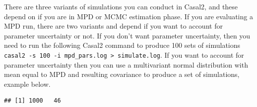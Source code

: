\documentclass[
]{book}
\newenvironment{Shaded}{\begin{snugshade}}{\end{snugshade}}
\newcommand{\AlertTok}[1]{\textcolor[rgb]{0.94,0.16,0.16}{#1}}
\newcommand{\AttributeTok}[1]{\textcolor[rgb]{0.77,0.63,0.00}{#1}}
\newcommand{\CommentTok}[1]{\textcolor[rgb]{0.56,0.35,0.01}{\textit{#1}}}
\newcommand{\ConstantTok}[1]{\textcolor[rgb]{0.00,0.00,0.00}{#1}}
\newcommand{\ControlFlowTok}[1]{\textcolor[rgb]{0.13,0.29,0.53}{\textbf{#1}}}
\newcommand{\DecValTok}[1]{\textcolor[rgb]{0.00,0.00,0.81}{#1}}
\newcommand{\DocumentationTok}[1]{\textcolor[rgb]{0.56,0.35,0.01}{\textbf{\textit{#1}}}}
\newcommand{\FunctionTok}[1]{\textcolor[rgb]{0.00,0.00,0.00}{#1}}
\newcommand{\NormalTok}[1]{#1}
\newcommand{\OtherTok}[1]{\textcolor[rgb]{0.56,0.35,0.01}{#1}}
\newcommand{\SpecialCharTok}[1]{\textcolor[rgb]{0.00,0.00,0.00}{#1}}
\newcommand{\StringTok}[1]{\textcolor[rgb]{0.31,0.60,0.02}{#1}}
\begin{document}
There are three variants of simulations you can conduct in Casal2, and these depend on if you are in MPD or MCMC estimation phase. If you are evaluating a MPD run, there are two variants and depend if you want to account for parameter uncertainty or not. If you don't want parameter uncertainty, then you need to run the following Casal2 command to produce 100 sets of simulations \texttt{casal2\ -s\ 100\ -i\ mpd\_pars.log\ \textgreater{}\ simulate.log}. If you want to account for parameter uncertainty then you can use a multivariant normal distribution with mean equal to MPD and resulting covariance to produce a set of simulations, example below.

\begin{Shaded}
\end{Shaded}

\begin{verbatim}
## [1] 1000   46
\end{verbatim}

\begin{Shaded}
\end{Shaded}
\end{document}
